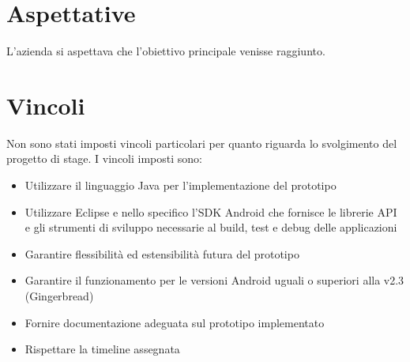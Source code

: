 
\section{Aspettative}

L'azienda si aspettava che l'obiettivo principale venisse raggiunto.


\section{Vincoli}

Non sono stati imposti vincoli particolari per quanto riguarda lo svolgimento del progetto di stage.
I vincoli imposti sono:
\begin{itemize}
 	\item Utilizzare il linguaggio Java per l'implementazione del prototipo
 	\item Utilizzare Eclipse e nello specifico l'SDK Android che fornisce le librerie API e gli strumenti di sviluppo necessarie al build, test e debug delle applicazioni
 	\item Garantire flessibilità ed estensibilità futura del prototipo
 	\item Garantire il funzionamento per le versioni Android uguali o superiori alla v2.3 (Gingerbread)
 	\item Fornire documentazione adeguata sul prototipo implementato
 	\item Rispettare la timeline assegnata
\end{itemize}



